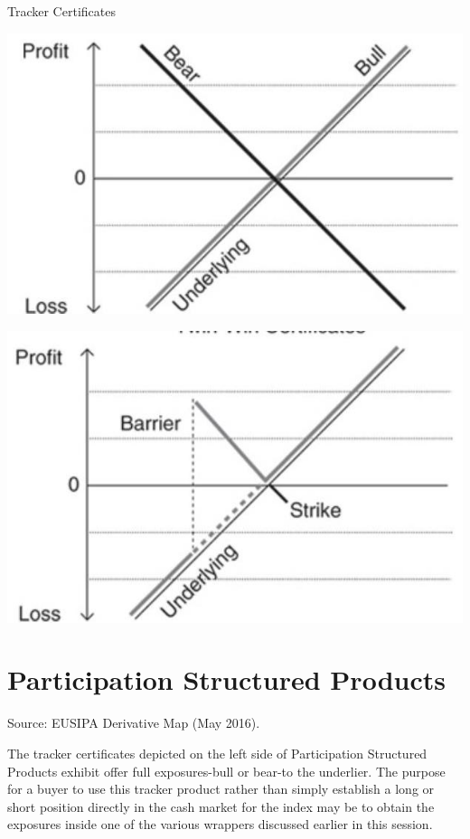 \documentclass[11pt]{article}
\begin{document}
Tracker Certificates

\begin{center}
\includegraphics[max width=\textwidth]{2024_04_10_b75ef470ae043c0f718dg-3(3)}
\end{center}

\begin{center}
\includegraphics[max width=\textwidth]{2024_04_10_b75ef470ae043c0f718dg-3}
\end{center}

\section*{Participation Structured Products}
Source: EUSIPA Derivative Map (May 2016).

The tracker certificates depicted on the left side of Participation Structured Products exhibit offer full exposures-bull or bear-to the underlier. The purpose for a buyer to use this tracker product rather than simply establish a long or short position directly in the cash market for the index may be to obtain the exposures inside one of the various wrappers discussed earlier in this session.
\end{document}
